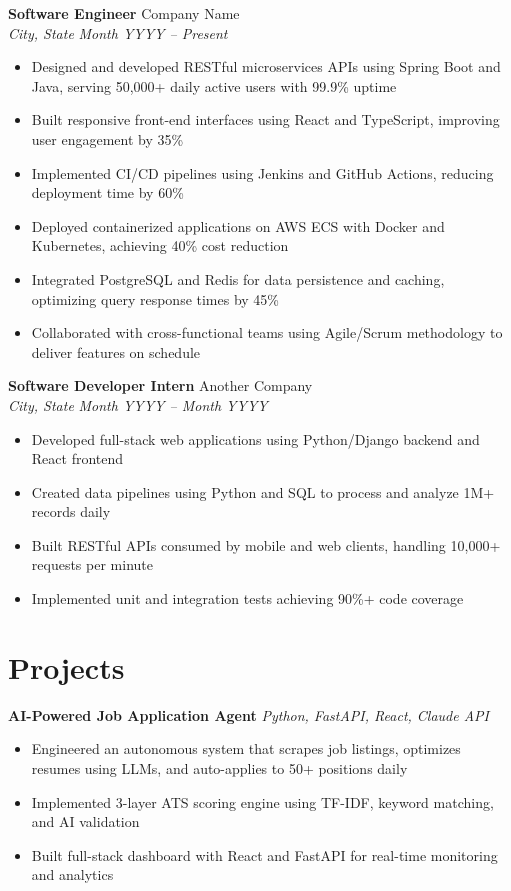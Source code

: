 \documentclass[11pt,letterpaper]{article}
\begin{document}
\textbf{Software Engineer} \hfill Company Name \\
\textit{City, State} \hfill \textit{Month YYYY -- Present}
\begin{itemize}
    \item Designed and developed RESTful microservices APIs using Spring Boot and Java, serving 50,000+ daily active users with 99.9\% uptime
    \item Built responsive front-end interfaces using React and TypeScript, improving user engagement by 35\%
    \item Implemented CI/CD pipelines using Jenkins and GitHub Actions, reducing deployment time by 60\%
    \item Deployed containerized applications on AWS ECS with Docker and Kubernetes, achieving 40\% cost reduction
    \item Integrated PostgreSQL and Redis for data persistence and caching, optimizing query response times by 45\%
    \item Collaborated with cross-functional teams using Agile/Scrum methodology to deliver features on schedule
\end{itemize}

\textbf{Software Developer Intern} \hfill Another Company \\
\textit{City, State} \hfill \textit{Month YYYY -- Month YYYY}
\begin{itemize}
    \item Developed full-stack web applications using Python/Django backend and React frontend
    \item Created data pipelines using Python and SQL to process and analyze 1M+ records daily
    \item Built RESTful APIs consumed by mobile and web clients, handling 10,000+ requests per minute
    \item Implemented unit and integration tests achieving 90\%+ code coverage
\end{itemize}

\section{Projects}

\textbf{AI-Powered Job Application Agent} \hfill \textit{Python, FastAPI, React, Claude API}
\begin{itemize}
    \item Engineered an autonomous system that scrapes job listings, optimizes resumes using LLMs, and auto-applies to 50+ positions daily
    \item Implemented 3-layer ATS scoring engine using TF-IDF, keyword matching, and AI validation
    \item Built full-stack dashboard with React and FastAPI for real-time monitoring and analytics
\end{itemize}
\end{document}
